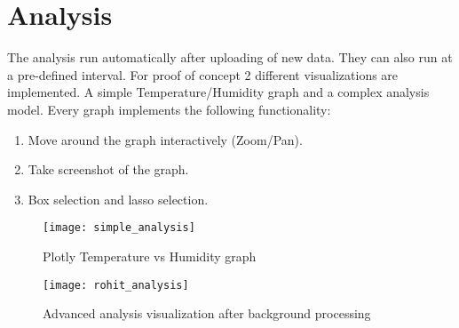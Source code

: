 \section{Analysis}

The analysis run automatically after uploading of new data. They can also
run at a pre-defined interval. For proof of concept 2 different visualizations
are implemented. A simple Temperature/Humidity graph and a complex analysis model.
Every graph implements the following functionality:
\begin{enumerate}
	\item\label{step:first} Move around the graph interactively (Zoom/Pan).
	\item Take screenshot of the graph.
	\item Box selection and lasso selection.
\end{enumerate}

\begin{figure}[H]
	\centering
	\texttt{[image: simple\_analysis]}
	\caption{Plotly Temperature vs Humidity graph}
	\label{fig:simple-analysis}
\end{figure}

\begin{figure}[H]
	\centering
	\texttt{[image: rohit\_analysis]}
	\caption{Advanced analysis visualization after background processing}
	\label{fig:rohit-analysis}
\end{figure}